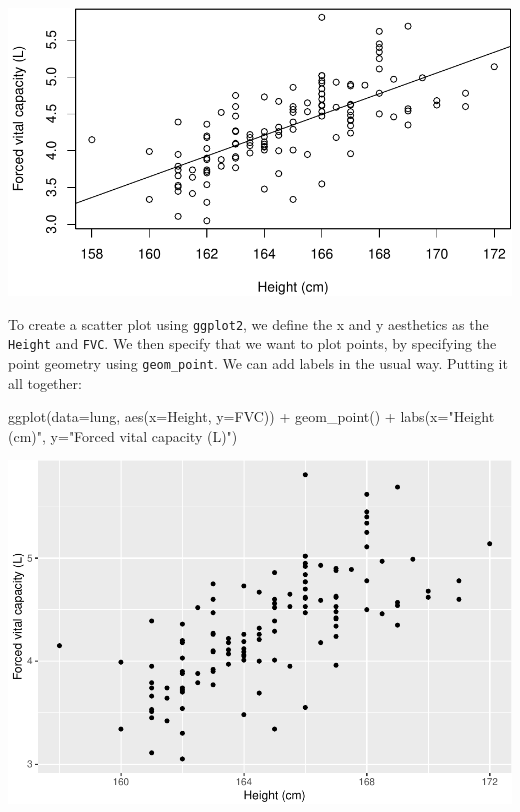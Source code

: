 \documentclass[
]{memoir}
\newenvironment{Shaded}{\begin{snugshade}}{\end{snugshade}}
\newcommand{\AttributeTok}[1]{\textcolor[rgb]{0.77,0.63,0.00}{#1}}
\newcommand{\FunctionTok}[1]{\textcolor[rgb]{0.00,0.00,0.00}{#1}}
\newcommand{\NormalTok}[1]{#1}
\newcommand{\SpecialCharTok}[1]{\textcolor[rgb]{0.00,0.00,0.00}{#1}}
\newcommand{\StringTok}[1]{\textcolor[rgb]{0.31,0.60,0.02}{#1}}
\begin{document}
\includegraphics{08.1-correlation-regression-R_files/figure-latex/unnamed-chunk-3-1.pdf}

To create a scatter plot using \texttt{ggplot2}, we define the x and y aesthetics as the \texttt{Height} and \texttt{FVC}. We then specify that we want to plot points, by specifying the point geometry using \texttt{geom\_point}. We can add labels in the usual way. Putting it all together:

\begin{Shaded}
\begin{Highlighting}[]
\FunctionTok{ggplot}\NormalTok{(}\AttributeTok{data=}\NormalTok{lung, }\FunctionTok{aes}\NormalTok{(}\AttributeTok{x=}\NormalTok{Height, }\AttributeTok{y=}\NormalTok{FVC)) }\SpecialCharTok{+} 
  \FunctionTok{geom\_point}\NormalTok{() }\SpecialCharTok{+}
  \FunctionTok{labs}\NormalTok{(}\AttributeTok{x=}\StringTok{"Height (cm)"}\NormalTok{, }\AttributeTok{y=}\StringTok{"Forced vital capacity (L)"}\NormalTok{)}
\end{Highlighting}
\end{Shaded}

\includegraphics{08.1-correlation-regression-R_files/figure-latex/unnamed-chunk-4-1.pdf}
\end{document}
